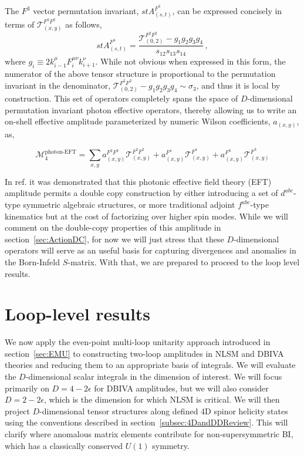 \documentclass[11pt,letter]{article}
\def\sect#1{section~\ref{#1}}
\begin{document}
The $F^3$ vector permutation invariant, $st A^{F^3}_{(s,t)}$, can be expressed concisely in terms of $\mathcal{T}^{F^2F^2}_{(x,y)}$ as follows,
\begin{equation}
st A^{F^3}_{(s,t)} = \frac{\mathcal{T}^{F^2F^2}_{(0,2)} -g_1g_2g_3g_4}{s_{12}s_{13}s_{14}}\,,
\end{equation}
where $g_i \equiv 2 k_{i-1}^\mu F^{\mu\nu}_i k^{\nu}_{i+1}$. While not obvious when expressed in this form, the numerator of the above tensor structure is proportional to the permutation invariant in the denominator, $\mathcal{T}^{F^2F^2}_{(0,2)} -g_1g_2g_3g_4\sim \sigma_3$, and thus it is local by construction. This set of operators completely spans the space of $D$-dimensional permutation invariant photon effective operators, thereby allowing us to write an on-shell effective amplitude parameterized by numeric Wilson coefficients, $a_{(x,y)}$, as,
\begin{eBox}
\begin{equation}
\mathcal{M}^{\text{photon-EFT}}_4 = \sum_{x,y} a_{(x,y)}^{F^2F^2}\mathcal{T}^{F^2F^2}_{(x,y)}+a_{(x,y)}^{F^4}\mathcal{T}^{F^4}_{(x,y)}+a_{(x,y)}^{F^3}\mathcal{T}^{F^3}_{(x,y)}
\end{equation}
\end{eBox}
In ref. \cite{Carrasco:2022jxn} it was demonstrated that this photonic effective field theory (EFT) amplitude permits a double copy construction by either introducing a set of $d^{abc}$-type symmetric algebraic structures, or more traditional adjoint $f^{abc}$-type kinematics but at the cost of factorizing over higher spin modes. While we will comment on the double-copy properties of this amplitude in \sect{sec:ActionDC}, for now we will just stress that these $D$-dimensional operators will serve as an useful basis for capturing divergences and anomalies in the Born-Infeld $S$-matrix. With that, we are prepared to proceed to the loop level results. 


\section{Loop-level results}\label{sec:Loops}
We now apply the even-point multi-loop unitarity approach introduced in \sect{sec:EMU} to constructing two-loop amplitudes in NLSM and DBIVA theories and reducing them to an appropriate basis of integrals. We will evaluate the $D$-dimensional scalar integrals in the dimension of interest. We will focus primarily on $D=4-2\epsilon$ for DBIVA amplitudes, but we will also consider $D=2-2\epsilon$, which is the dimension for which NLSM is critical.   We will then project $D$-dimensional tensor structures along defined 4D spinor helicity states using the conventions described in \sect{subsec:4DandDDReview}. This will clarify where anomalous matrix elements contribute for non-supersymmetric BI, which has a classically conserved $U(1)$ symmetry. 
\end{document}
